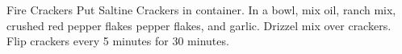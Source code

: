\documentclass[../main.tex]{subfiles}
\begin{document}
\begin{recipe}{Fire Crackers}{}{}
    Put Saltine Crackers in container.
    In a bowl, mix oil, ranch mix, crushed red pepper flakes
    pepper flakes, and garlic. Drizzel mix over crackers. Flip
    crackers every 5 minutes for 30 minutes.
    
\end{recipe}
\end{document}
